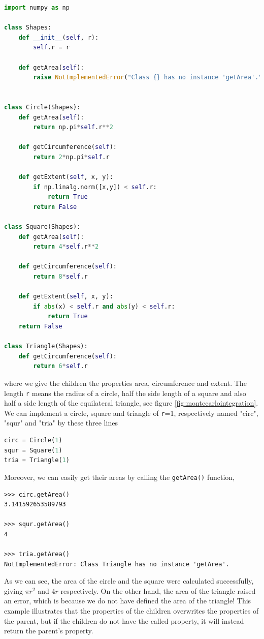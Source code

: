 \lstset{basicstyle=\scriptsize}
\begin{lstlisting}[language=python]
import numpy as np

class Shapes:
	def __init__(self, r):
		self.r = r

	def getArea(self):
		raise NotImplementedError("Class {} has no instance 'getArea'.".format(self.__class__.__name__))


class Circle(Shapes):
	def getArea(self):
		return np.pi*self.r**2

	def getCircumference(self):
		return 2*np.pi*self.r

	def getExtent(self, x, y):
		if np.linalg.norm([x,y]) < self.r:
			return True
		return False

class Square(Shapes):
	def getArea(self):
		return 4*self.r**2

	def getCircumference(self):
		return 8*self.r

	def getExtent(self, x, y):
		if abs(x) < self.r and abs(y) < self.r:
			return True
	return False

class Triangle(Shapes):
	def getCircumference(self):
		return 6*self.r
\end{lstlisting}
where we give the children the properties area, circumference and extent. The length \texttt{r} means the radius of a circle, half the side length of a square and also half a side length of the equilateral triangle, see figure \eqref{fig:montecarlointegration}. We can implement a circle, square and triangle of \texttt{r}=1, respectively named "circ", "squr" and "tria" by these three lines
\lstset{basicstyle=\scriptsize}
\begin{lstlisting}[language=python]
circ = Circle(1)
squr = Square(1)
tria = Triangle(1)
\end{lstlisting}
Moreover, we can easily get their areas by calling the \texttt{getArea()} function,
\lstset{basicstyle=\scriptsize}
\begin{lstlisting}
>>> circ.getArea()
3.141592653589793

>>> squr.getArea()
4

>>> tria.getArea()
NotImplementedError: Class Triangle has no instance 'getArea'.
\end{lstlisting}

As we can see, the area of the circle and the square were calculated successfully, giving $\pi r^2$ and $4r$ respectively. On the other hand, the area of the triangle raised an error, which is because we do not have defined the area of the triangle! This example illustrates that the properties of the children overwrites the properties of the parent, but if the children do not have the called property, it will instead return the parent's property. 

